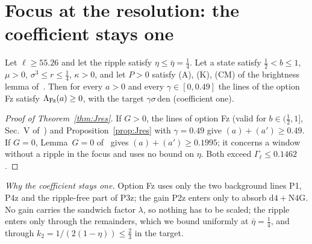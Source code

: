 \section{Focus at the resolution: the coefficient stays one}
\label{sec:res}

\begin{proposition} \proofst
\label{prop:Jres}
Let $\ell\ge55.26$ and let the ripple satisfy $\eta\le\bar\eta=\tfrac14$.
Let a state satisfy $\tfrac12<b\le1$, $\mu>0$, $\sigma^3\le r\le\tfrac14$, $\kappa>0$, and let $P>0$ satisfy (A), (K), (CM) of the brightness lemma of~\cite{I}.
Then for every $a>0$ and every $\gamma\in[0,0.49]$ the lines of the option Fz satisfy $\Lambda_{\rm Fz}(a)\ge0$, with the target $\gamma\sigma\,\mathrm{den}$ (coefficient one).
\end{proposition}

\begin{proof}[Proof of Theorem~\ref{thm:Jres}]
If $G>0$, the lines of option Fz (valid for $b\in(\tfrac12,1]$, Sec.~V of~\cite{I}) and Proposition~\ref{prop:Jres} with $\gamma=0.49$ give $(a)+(a')\ge0.49$.
If $G=0$, Lemma~$G=0$ of~\cite{I} gives $(a)+(a')\ge0.1995$; it concerns a window without a ripple in the focus and uses no bound on $\eta$.
Both exceed $\Gamma_\ell\le0.1462$.
\end{proof}

\emph{Why the coefficient stays one.}
Option Fz uses only the two background lines P1, P4z and the ripple-free part of P3z; the gain P2z enters only to absorb $\mathrm{d4}+\mathrm{N4G}$.
No gain carries the sandwich factor $\lambda$, so nothing has to be scaled; the ripple enters only through the remainders, which we bound uniformly at $\bar\eta=\tfrac14$, and through $k_2=1/(2(1-\eta))\le\tfrac23$ in the target.

